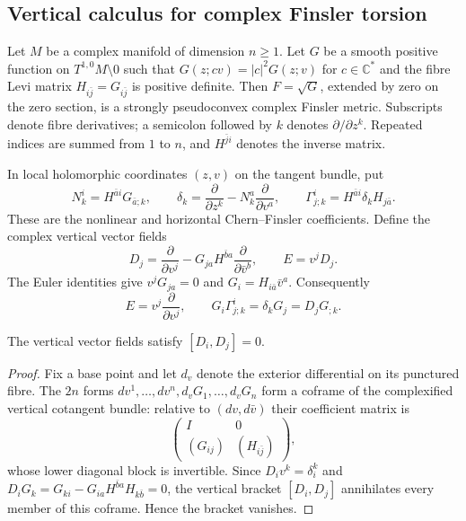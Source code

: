 \subsection{Vertical calculus for complex Finsler torsion}
\label{subsec:weak-kahler-finsler-vertical-calculus}

Let $M$ be a complex manifold of dimension $n\geq1$. Let $G$ be a smooth positive function on $T^{1,0}M\setminus0$ such that $G(z;cv)=|c|^2G(z;v)$ for $c\in\mathbb C^*$ and the fibre Levi matrix $H_{i\bar j}=G_{i\bar j}$ is positive definite. Then $F=\sqrt G$, extended by zero on the zero section, is a strongly pseudoconvex complex Finsler metric. Subscripts denote fibre derivatives; a semicolon followed by $k$ denotes $\partial/\partial z^k$. Repeated indices are summed from $1$ to $n$, and $H^{\bar j i}$ denotes the inverse matrix.

In local holomorphic coordinates $(z,v)$ on the tangent bundle, put
\[
 N^i_k=H^{\bar a i}G_{\bar a;k},\qquad
 \delta_k=\frac{\partial}{\partial z^k}-N^a_k\frac{\partial}{\partial v^a},\qquad
 \Gamma^i_{j;k}=H^{\bar a i}\delta_kH_{j\bar a}.
\]
These are the nonlinear and horizontal Chern--Finsler coefficients. Define the complex vertical vector fields
\[
 D_j=\frac{\partial}{\partial v^j}-G_{ja}H^{\bar b a}\frac{\partial}{\partial\bar v^b},
 \qquad E=v^jD_j.
\]
The Euler identities give $v^jG_{ja}=0$ and $G_i=H_{i\bar a}\bar v^a$. Consequently
\[
 E=v^j\frac{\partial}{\partial v^j},\qquad
 G_i\Gamma^i_{j;k}=\delta_kG_j=D_jG_{;k}.
\]

\begin{lemma}\label{lem:finsler-adapted-vertical-commutation}
The vertical vector fields satisfy $[D_i,D_j]=0$.
\end{lemma}
\begin{proof}
Fix a base point and let $d_v$ denote the exterior differential on its punctured fibre. The $2n$ forms $dv^1,\ldots,dv^n,d_vG_1,\ldots,d_vG_n$ form a coframe of the complexified vertical cotangent bundle: relative to $(dv,d\bar v)$ their coefficient matrix is
\[
 \begin{pmatrix}I&0\\ (G_{ij})&(H_{i\bar j})\end{pmatrix},
\]
whose lower diagonal block is invertible. Since $D_iv^k=\delta_i^k$ and $D_iG_k=G_{ki}-G_{ia}H^{\bar b a}H_{k\bar b}=0$, the vertical bracket $[D_i,D_j]$ annihilates every member of this coframe. Hence the bracket vanishes.
\end{proof}

